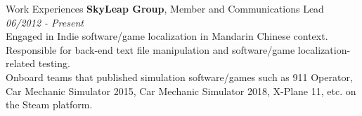 \documentclass{resume} %
\begin{document}
\begin{rSection}{Work Experiences}
{\bf SkyLeap Group}{, Member and Communications Lead} \hfill {\em 06/2012 - Present}\\
Engaged in Indie software/game localization in Mandarin Chinese context. \\
Responsible for back-end text file manipulation and software/game localization-related testing.\\
Onboard teams that published simulation software/games such as 911 Operator, Car Mechanic Simulator 2015, Car Mechanic Simulator 2018, X-Plane 11, etc. on the Steam platform.\\
\end{rSection}
\end{document}
